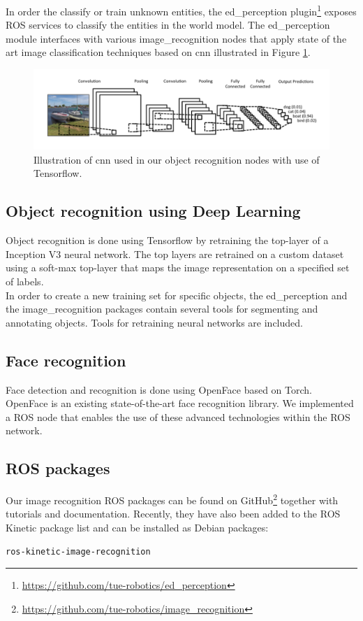 In order the classify or train unknown entities, the ed\_perception plugin\footnote{\url{https://github.com/tue-robotics/ed_perception}} exposes ROS services to classify the entities in the world model. The ed\_perception module interfaces with various image\_recognition nodes that apply state of the art image classification techniques based on \acrfull{cnn} illustrated in Figure \ref{fig:cnn}.
\begin{figure}[H]
    \centering
	\includegraphics[width = 1\linewidth]{Figures/cnn}
    \caption{Illustration of \acrfull{cnn} used in our object recognition nodes with use of Tensorflow.}
	\label{fig:cnn}
\end{figure}

\subsection{Object recognition using Deep Learning}
Object recognition is done using Tensorflow by retraining the top-layer of a Inception V3 neural network. The top layers are retrained on a custom dataset using a soft-max top-layer that maps the image representation on a specified set of labels.
\\
In order to create a new training set for specific objects, the ed\_perception and the image\_recognition packages contain several tools for segmenting and annotating objects. Tools for retraining neural networks are included.

\subsection{Face recognition}
Face detection and recognition is done using OpenFace based on Torch. OpenFace is an existing state-of-the-art face recognition library. We implemented a ROS node that enables the use of these advanced technologies within the ROS network.
\subsection{ROS packages}
Our image recognition ROS packages can be found on GitHub\footnote{\url{https://github.com/tue-robotics/image_recognition}} together with tutorials and documentation. Recently, they have also been added to the ROS Kinetic package list and can be installed as Debian packages:
\begin{lstlisting}
ros-kinetic-image-recognition
\end{lstlisting} 
